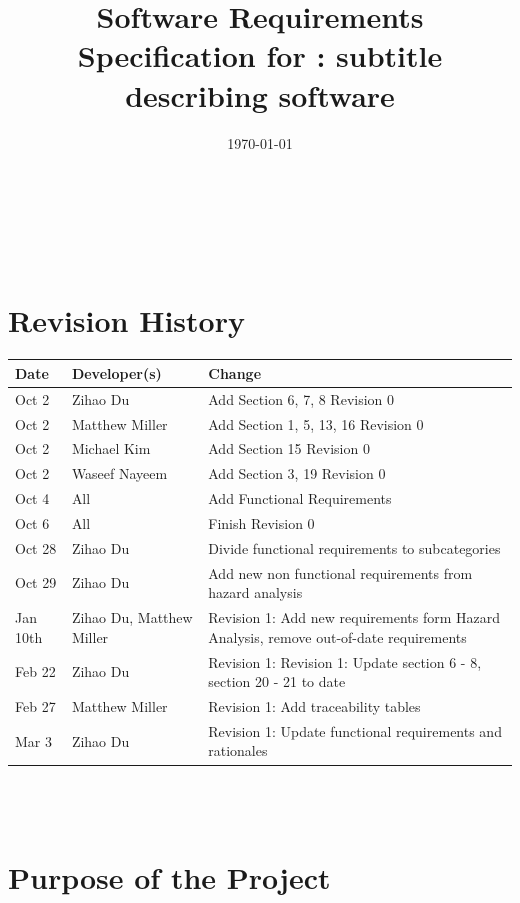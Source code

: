 \documentclass[12pt]{article}
\begin{document}

\title{Software Requirements Specification for \progname: subtitle describing software} 
\author{\authname}
\date{\today}
	
\maketitle

~\newpage


\tableofcontents

~\newpage

\section*{Revision History}

\begin{tabularx}{\textwidth}{p{3cm}p{3cm}X}
\toprule {\textbf{Date}} & {\textbf{Developer(s)}} & {\textbf{Change}}\\
\midrule
Oct 2 & Zihao Du & Add Section 6, 7, 8 Revision 0\\
Oct 2 & Matthew Miller & Add Section 1, 5, 13, 16 Revision 0\\
Oct 2 & Michael Kim & Add Section 15 Revision 0\\
Oct 2 & Waseef Nayeem & Add Section 3, 19 Revision 0\\
Oct 4 & All & Add Functional Requirements\\
Oct 6 & All & Finish Revision 0\\
Oct 28 & Zihao Du & Divide functional requirements to subcategories\\
Oct 29 & Zihao Du & Add new non functional requirements from hazard analysis\\
Jan 10th & Zihao Du, Matthew Miller & Revision 1: Add new requirements form Hazard Analysis, remove out-of-date requirements\\
Feb 22 & Zihao Du & Revision 1: Revision 1: Update section 6 - 8, section 20 - 21 to date\\
Feb 27 & Matthew Miller & Revision 1: Add traceability tables\\
Mar 3 & Zihao Du & Revision 1: Update functional requirements and rationales\\
\bottomrule
\end{tabularx}

~\\

~\newpage
\section{Purpose of the Project}
\end{document}
